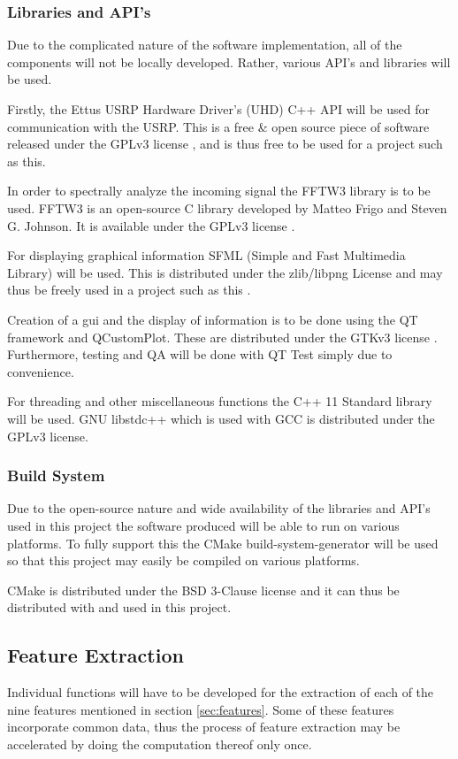 \documentclass[10pt,onecolumn]{witseiepaper}
\begin{document}
\begin{multicols}{2}
		\subsubsection{Libraries and API's}
			Due to the complicated nature of the software implementation, all of the components will not be locally developed. Rather, various API's and libraries will be used.

			Firstly, the Ettus USRP Hardware Driver's (UHD) C++ API will be used for communication with the USRP. This is a free \& open source piece of software released under the GPLv3 license \cite{uhd_license}, and is thus free to be used for a project such as this.

			In order to spectrally analyze the incoming signal the FFTW3 library is to be used. FFTW3 is an open-source C library developed by Matteo Frigo and Steven G. Johnson. It is available under the GPLv3 license \cite{fftw3_license}.

			For displaying graphical information SFML (Simple and Fast Multimedia Library) will be used. This is distributed under the zlib/libpng License and may thus be freely used in a project such as this \cite{sfml_license}.

			Creation of a gui and the display of information is to be done using the QT framework and QCustomPlot. These are distributed under the GTKv3 license \cite{qt_license, qcustomplot_license}. Furthermore, testing and QA will be done with QT Test simply due to convenience.

			For threading and other miscellaneous functions the C++ 11 Standard library will be used. GNU libstdc++ which is used with GCC is distributed under the GPLv3 license.

		\subsubsection{Build System}
			Due to the open-source nature and wide availability of the libraries and API's used in this project the software produced will be able to run on various platforms. To fully support this the CMake build-system-generator will be used so that this project may easily be compiled on various platforms.

			CMake is distributed under the BSD 3-Clause license \cite{cmake_license} and it can thus be distributed with and used in this project.

	\subsection{Feature Extraction}
		\label{sec:feat_fun}
		Individual functions will have to be developed for the extraction of each of the nine features mentioned in section \ref{sec:features}. Some of these features incorporate common data, thus the process of feature extraction may be accelerated by doing the computation thereof only once.


\end{multicols}
\end{document}
